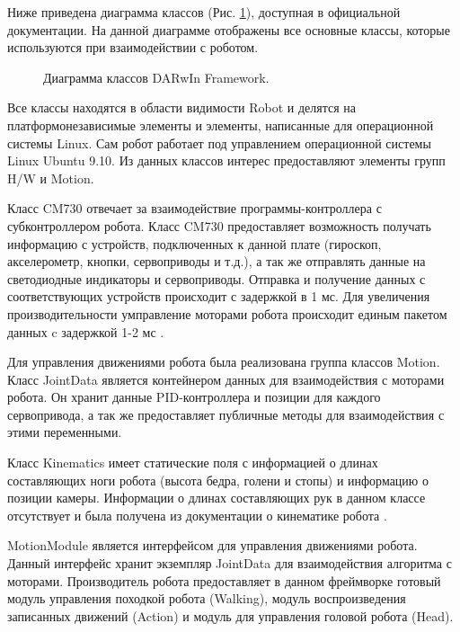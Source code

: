 Ниже приведена диаграмма классов (Рис. \ref{im:1_framework_class_diagram}), доступная в официальной документации\cite{urldarwinopemanual}. На данной диаграмме отображены все основные классы, которые используются при взаимодействии с роботом.

\begin{figure}[h]
\caption{Диаграмма классов DARwIn Framework.}
\label{im:1_framework_class_diagram}
\end{figure}

Все классы находятся в области видимости Robot и делятся на платформонезависимые элементы и элементы, написанные для операционной системы Linux. Сам робот работает под управлением операционной системы Linux Ubuntu 9.10. Из данных классов интерес предоставляют элементы групп H/W и Motion.

Класс CM730 отвечает за взаимодействие программы-контроллера с субконтроллером робота. Класс CM730 предоставляет возможность получать информацию с устройств, подключенных к данной плате (гироскоп, акселерометр, кнопки, сервоприводы и т.д.), а так же отправлять данные на светодиодные индикаторы и сервоприводы. Отправка и получение данных с соответствующих устройств происходит с задержкой в 1 мс. Для увеличения производительности умправление моторами робота происходит единым пакетом данных c задержкой 1-2 мс \cite{mansolino2013robot}.

Для управления движениями робота была реализована группа классов Motion. Класс JointData является контейнером данных для взаимодействия с моторами робота. Он хранит данные PID-контроллера  и позиции для каждого сервопривода, а так же предоставляет публичные методы для взаимодействия с этими переменными.

Класс Kinematics имеет статические поля с информацией о длинах составляющих ноги робота (высота бедра, голени и стопы) и информацию о позиции камеры. Информации о длинах составляющих рук в данном классе отсутствует и была получена из документации о кинематике робота \cite{williams2012darwin}.

MotionModule является интерфейсом для управления движениями робота. Данный интерфейс хранит экземпляр JointData для взаимодействия алгоритма с моторами. Производитель робота предоставляет в данном фреймворке готовый модуль управления походкой робота (Walking), модуль воспроизведения записанных движений (Action) и модуль для управления головой робота (Head).


